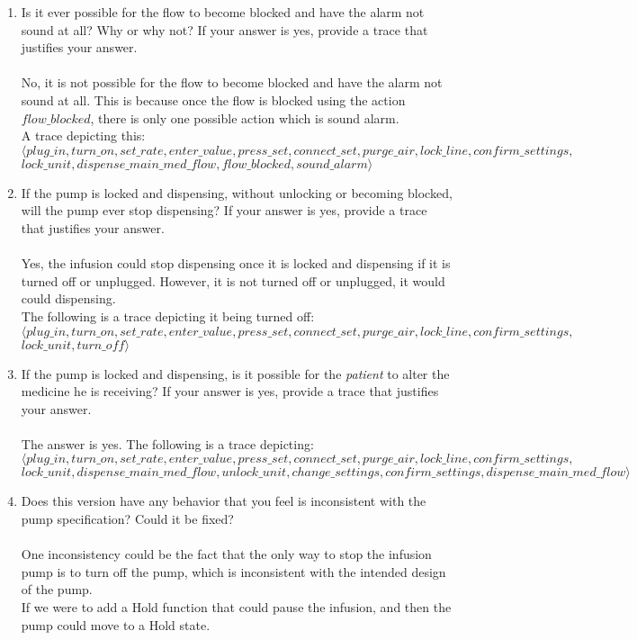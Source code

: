 ﻿\documentclass{article}
\begin{document}
\begin{enumerate}
\item Is it ever possible for the flow to become blocked and have the alarm not sound at all?  Why or why not? If your answer is yes, provide a trace that justifies your answer. \\
\\
No, it is not possible for the flow to become blocked and have the alarm not sound at all. This is because once the flow is blocked using the action $flow\_blocked$, there is only one possible action which is sound alarm. \\
A trace depicting this:\\
$\langle plug\_in, turn\_on, set\_rate, enter\_value, press\_set, connect\_set, purge\_air, lock\_line, confirm \_settings,$\\ $lock\_unit, dispense\_main\_med\_flow, flow\_blocked, sound\_alarm \rangle$
  
  
\item If the pump is locked and dispensing, without unlocking or becoming blocked, will the pump ever stop dispensing? If your answer is yes, provide a trace that justifies your answer. \\
\\
Yes, the infusion could stop dispensing once it is locked and dispensing if it is turned off or unplugged. However, it is not turned off or unplugged, it would could dispensing.\\
The following is a trace depicting it being turned off:\\


$\langle plug\_in, turn\_on, set\_rate, enter\_value, press\_set, connect\_set, purge\_air, lock\_line, confirm\_settings,$\\
$lock\_unit, turn\_off \rangle$
  
\item If the pump is locked and dispensing, is it possible for the \emph{patient} to alter the medicine he is receiving? If your answer is yes, provide a trace that justifies your answer.\\
\\
The answer is yes. The following is a trace depicting: \\
$\langle plug\_in, turn\_on, set\_rate, enter\_value, press\_set, connect\_set, purge\_air, lock\_line, confirm\_settings,$\\ $lock\_unit, dispense\_main\_med\_flow, unlock\_unit, change\_settings, confirm\_settings, dispense\_main\_med\_flow \rangle$
  
\item Does this version have any behavior that you feel is inconsistent with the pump specification? Could it be fixed? \\  
\\
One inconsistency could be the fact that the only way to stop the infusion pump is to turn off the pump, which is inconsistent with the intended design of the pump.
\\
If we were to add a Hold function that could pause the infusion, and then the pump could move to a Hold state.\\


\end{enumerate}
\end{document}
